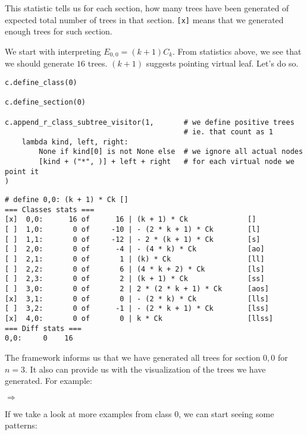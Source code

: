 \documentclass[final]{article}
\theoremstyle{definition}
\theoremstyle{remark}
\newcommand{\includeinlinesvg}[2]{\begin{minipage}{#1\textwidth}\end{minipage}}
\begin{document}
This statistic tells us for each section, how many trees have been generated of expected total number of trees in that section. \verb|[x]| means that we generated enough trees for such section.

We start with interpreting \(E_{0,0} = (k + 1) C_k\). From statistics above, we see that we should generate \(16\) trees. \((k + 1)\) suggests pointing virtual leaf. Let's do so.

\begin{lstlisting}
c.define_class(0)

c.define_section(0)

c.append_r_class_subtree_visitor(1,       # we define positive trees
                                          # ie. that count as 1
    lambda kind, left, right:
        None if kind[0] is not None else  # we ignore all actual nodes
        [kind + ("*", )] + left + right   # for each virtual node we point it
)
\end{lstlisting}

\begin{lstlisting}
# define 0,0: (k + 1) * Ck []
=== Classes stats ===
[x]  0,0:      16 of      16 | (k + 1) * Ck              []
[ ]  1,0:       0 of     -10 | - (2 * k + 1) * Ck        [l]
[ ]  1,1:       0 of     -12 | - 2 * (k + 1) * Ck        [s]
[ ]  2,0:       0 of      -4 | - (4 * k) * Ck            [ao]
[ ]  2,1:       0 of       1 | (k) * Ck                  [ll]
[ ]  2,2:       0 of       6 | (4 * k + 2) * Ck          [ls]
[ ]  2,3:       0 of       2 | (k + 1) * Ck              [ss]
[ ]  3,0:       0 of       2 | 2 * (2 * k + 1) * Ck      [aos]
[x]  3,1:       0 of       0 | - (2 * k) * Ck            [lls]
[ ]  3,2:       0 of      -1 | - (2 * k + 1) * Ck        [lss]
[x]  4,0:       0 of       0 | k * Ck                    [llss]
=== Diff stats ===
0,0:     0    16
\end{lstlisting}

The framework informs us that we have generated all trees for section \(0,0\) for \(n = 3\). It also can provide us with the visualization of the trees we have generated. For example:

\includeinlinesvg{.19}{lambda__trees_00__4_base}%
\(\Rightarrow\)
\includeinlinesvg{.19}{lambda__trees_00__4}%
\includeinlinesvg{.19}{lambda__trees_00__5}%
\includeinlinesvg{.19}{lambda__trees_00__6}%
\includeinlinesvg{.19}{lambda__trees_00__7}%

If we take a look at more examples from class \(0\), we can start seeing some patterns:
\end{document}
